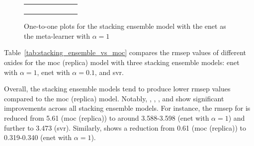 \begin{figure}
{\begin{tabular}{cc}
\begin{subfigure}{0.5\textwidth}
            \end{subfigure}
        \end{tabular}
    }
    \caption{One-to-one plots for the stacking ensemble model with the \gls{enet} as the meta-learner with $\alpha = 1$}
    \label{fig:elasticnet_one_to_one}
\end{figure}


\begin{table}
\centering
\caption{Comparison of \gls{rmsep} values for the \gls{moc} (replica) model and various stacking ensemble models.}
\label{tab:stacking_ensemble_vs_moc}
\end{table}

Table~\ref{tab:stacking_ensemble_vs_moc} compares the \gls{rmsep} values of different oxides for the \gls{moc} (replica) model with three stacking ensemble models: \gls{enet} with $\alpha = 1$, \gls{enet} with $\alpha = 0.1$, and \gls{svr}.

Overall, the stacking ensemble models tend to produce lower \gls{rmsep} values compared to the \gls{moc} (replica) model. Notably, , , , and  show significant improvements across all stacking ensemble models. For instance, the \gls{rmsep} for  is reduced from 5.61 (\gls{moc} (replica)) to around 3.588-3.598 (\gls{enet} with $\alpha = 1$) and further to 3.473 (\gls{svr}). Similarly,  shows a reduction from 0.61 (\gls{moc} (replica)) to 0.319-0.340 (\gls{enet} with $\alpha = 1$). 

